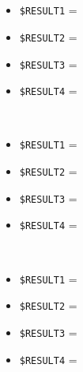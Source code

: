 \documentclass[../../SperimentazioniPratiche.tex]{subfiles}
\begin{document}
\begin{tcolorbox}[fonttitle=\bfseries, 
								adjusted title={\Large Prova 11A.1}, 
								breakable, 
								sharp corners=south,
								colback=white, 
								colframe=white!60!black]
\begin{description}[leftmargin=0.7cm,labelwidth=!]
        			\item[Output riscontrato] \ \par
        				\begin{description}
        				
        					\item[\dispositivoA] \ \par
        					\begin{itemize}
        						\item \verb|$RESULT1| = \ok
        						\item \verb|$RESULT2| = \ok
        						\item \verb|$RESULT3| = \ok
        						\item \verb|$RESULT4| = \ok
        					\end{itemize}      					
        					
        					\item[\dispositivoB] \ \par
        					\begin{itemize}
        						\item \verb|$RESULT1| = \ok
        						\item \verb|$RESULT2| = \ok
        						\item \verb|$RESULT3| = \ok
        						\item \verb|$RESULT4| = \ok
        					\end{itemize}
        					
        					\item[\dispositivoC] \ \par
        					\begin{itemize}
        						\item \verb|$RESULT1| = \ok
        						\item \verb|$RESULT2| = \ok
        						\item \verb|$RESULT3| = \ok
        						\item \verb|$RESULT4| = \ok
        					\end{itemize}
        					
        				\end{description}
        				
				\end{description}  
				
			\end{tcolorbox}


	
	\newpage		
\end{document}
